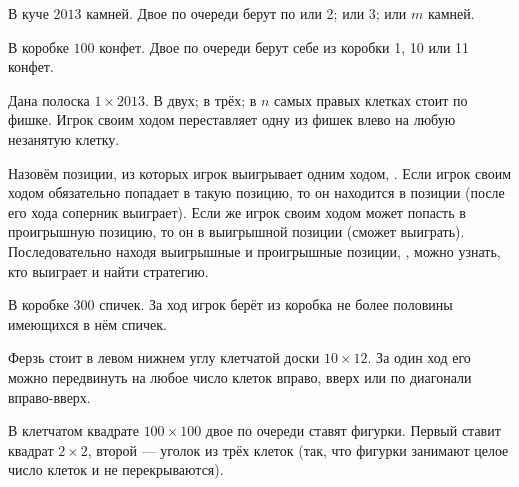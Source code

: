 \documentclass[a4paper,11pt]{article}
\begin{document}
В куче $2013$ камней. Двое по очереди берут по
 или 2;
 или 3;
 или $m$ камней. %

В коробке $100$ конфет. Двое по очереди берут себе из коробки
1, 10 или 11 конфет. %


Дана полоска $1\times2013$.
 В двух;
 в трёх;
 в $n$ самых правых клетках стоит по фишке.
Игрок своим ходом переставляет одну из фишек влево
на любую незанятую клетку.

\vspace*{.5mm}
{\small
Назовём позиции, из которых игрок выигрывает одним ходом,
. Если игрок своим ходом обязательно попадает
в такую позицию, то он находится в  позиции
(после его хода соперник выиграет). %
Если же игрок своим ходом может попасть в проигрышную позицию,
то он в выигрышной позиции (сможет выиграть).
Последовательно находя выигрышные и проигрышные позиции,
,
можно узнать, кто выиграет и найти стратегию.
}

\vspace*{1mm}

В коробке 300 спичек. %
За ход игрок берёт из коробка не более половины имеющихся в нём спичек.


Ферзь стоит в левом нижнем углу клетчатой доски $10\times12$. За один ход его
можно передвинуть на любое число клеток вправо, вверх или по диагонали
 вправо-вверх. %





\vspace*{-1truemm}



В клетчатом квадрате $100\times100$ двое по
очереди ставят фигурки.
Первый ставит квадрат $2\times2$, второй
--- уголок из трёх клеток (так, что
фигурки занимают целое число клеток и не перекрываются).
\end{document}
